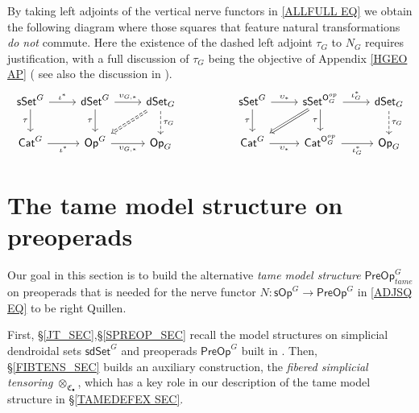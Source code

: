 \documentclass[a4paper,10pt
,draft
]{article}%
\numberwithin{equation}{section}
\numberwithin{figure}{section}
\theoremstyle{definition} %
\newcommand{\1}{\ensuremath{\mathbbm 1}}%
\begin{document}
By taking left adjoints of 
the vertical nerve functors in \eqref{ALLFULL EQ} 
we obtain the following diagram
where those squares that feature natural transformations
\emph{do not} commute. 
Here the existence of the dashed left adjoint 
$\tau_G$ to $N_G$
requires justification, 
with a full discussion of $\tau_G$
being the objective of Appendix \ref{HGEO AP}
({\color{red} see also the discussion in 
	\cite[Rem. \ref{W-GTAUFUNEX REM}]{BP_WCONS}}).
\begin{equation}\label{TAUFUNCTS EQ}
\begin{tikzcd}
	\mathsf{sSet}^G
	\ar{r}{\iota^{\**}}
	\ar{d}[swap]{\tau}
	&
	\mathsf{dSet}^G
	\ar{r}{\upsilon_{G,\**}}
	\ar{d}[swap]{\tau}
	&
	\mathsf{dSet}_G
	\ar[dashed]{d}{\tau_G}
	\ar[Rightarrow,dashed]{dl}
&&
	\mathsf{sSet}^G
	\ar{r}{\upsilon_{\**}}
	\ar{d}[swap]{\tau}
	&
	\mathsf{sSet}^{\mathsf{O}_G^{op}}
	\ar{r}{\iota^{\**}_G}
	\ar{d}[swap]{\tau}
	\ar[Rightarrow]{dl}
	&
	\mathsf{dSet}_G
	\ar[dashed]{d}{\tau_G}
\\
	\mathsf{Cat}^G
	\ar{r}[swap]{\iota^{\**}}
	&
	\mathsf{Op}^G
	\ar{r}[swap]{\upsilon_{G,\**}}
	&
	\mathsf{Op}_G
&&
	\mathsf{Cat}^G
	\ar{r}[swap]{\upsilon_{\**}}
	&
	\mathsf{Cat}^{\mathsf{O}_G^{op}}
	\ar{r}[swap]{\iota_{G}^{\**}}
	&
	\mathsf{Op}_G
\end{tikzcd}
\end{equation}





\section{The tame model structure on preoperads}
\label{TAME_SEC}


Our goal in this section is to build the alternative 
\emph{tame model structure}
$\mathsf{PreOp}^G_{tame}$
on preoperads that is needed for the nerve functor
$N \colon \mathsf{sOp}^G \to \mathsf{PreOp}^G$
in \eqref{ADJSQ EQ}
to be right Quillen. 

First, \S \ref{JT_SEC},\S \ref{SPREOP_SEC} 
recall the model structures on
simplicial dendroidal sets $\mathsf{sdSet}^G$
and preoperads $\mathsf{PreOp}^G$ built in \cite{BP_edss}.
Then, \S \ref{FIBTENS_SEC}
builds an auxiliary construction, 
the \emph{fibered simplicial tensoring} $\otimes_{\mathfrak{C}_{\bullet}}$,
which has a key role in our description of
the tame model structure in \S \ref{TAMEDEFEX SEC}. 
\end{document}
